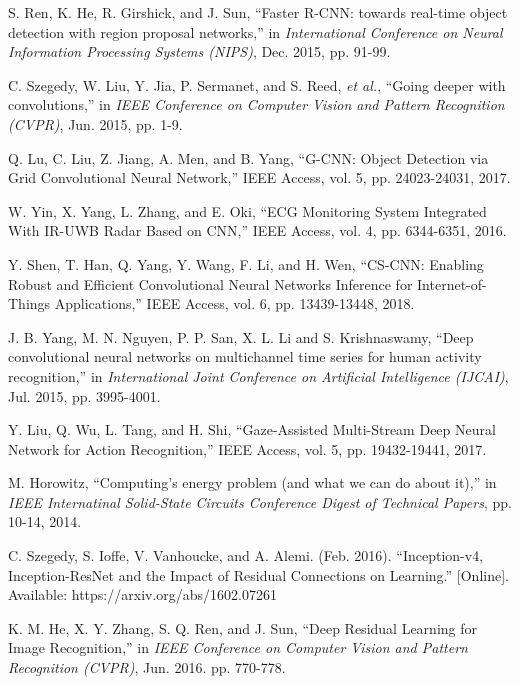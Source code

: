 \documentclass[twoside,twocolumn]{article}
\begin{document}
\begin{thebibliography}{00}

 S. Ren, K. He, R. Girshick, and J. Sun, ``Faster R-CNN: towards real-time object detection with region proposal networks,'' in \emph{International Conference on Neural Information Processing Systems (NIPS)}, Dec. 2015, pp. 91-99.

 C. Szegedy, W. Liu, Y. Jia, P. Sermanet, and S. Reed, \emph{et al.}, ``Going deeper with convolutions,'' in \emph{IEEE Conference on Computer Vision and Pattern Recognition (CVPR)}, Jun. 2015, pp. 1-9.

 Q. Lu, C. Liu, Z. Jiang, A. Men, and B. Yang, ``G-CNN: Object Detection via Grid Convolutional Neural Network,'' IEEE Access, vol. 5, pp. 24023-24031, 2017.

 W. Yin, X. Yang, L. Zhang, and E. Oki, ``ECG Monitoring System Integrated With IR-UWB Radar Based on CNN,'' IEEE Access, vol. 4, pp. 6344-6351, 2016.

 Y. Shen, T. Han, Q. Yang, Y. Wang, F. Li, and H. Wen, ``CS-CNN: Enabling Robust and Efficient Convolutional Neural Networks Inference for Internet-of-Things Applications,'' IEEE Access, vol. 6, pp. 13439-13448, 2018.

 J. B. Yang, M. N. Nguyen, P. P. San, X. L. Li and S. Krishnaswamy, ``Deep convolutional neural networks on multichannel time series for human activity recognition,'' in \emph{International Joint Conference on Artificial Intelligence (IJCAI)}, Jul. 2015, pp. 3995-4001.

 Y. Liu, Q. Wu, L. Tang, and H. Shi, ``Gaze-Assisted Multi-Stream Deep Neural Network for Action Recognition,'' IEEE Access, vol. 5, pp. 19432-19441, 2017.

 M. Horowitz, ``Computing's energy problem (and what we can do about it),'' in \emph{IEEE Internatinal Solid-State Circuits Conference Digest of Technical Papers}, pp. 10-14, 2014.

 C. Szegedy, S. Ioffe, V. Vanhoucke, and A. Alemi. (Feb. 2016). ``Inception-v4, Inception-ResNet and the Impact of Residual Connections on Learning.'' [Online]. Available: https://arxiv.org/abs/1602.07261

 K. M. He, X. Y. Zhang, S. Q. Ren, and J. Sun, ``Deep Residual Learning for Image Recognition,'' in \emph{IEEE Conference on Computer Vision and Pattern Recognition (CVPR)}, Jun. 2016. pp. 770-778.


\end{thebibliography}
\end{document}
